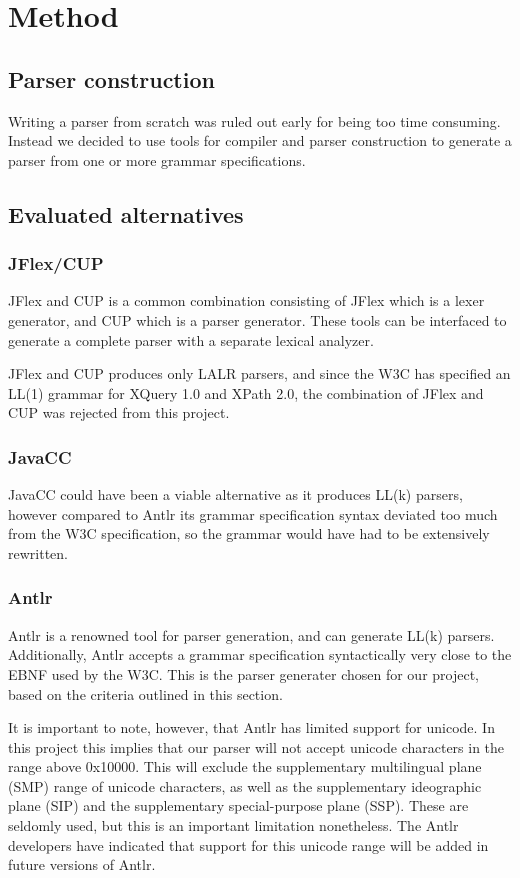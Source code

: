 \section{Method}
\subsection{Parser construction}
Writing a parser from scratch was ruled out early for being too time consuming.
Instead we decided to use tools for compiler and parser construction to generate
a parser from one or more grammar specifications.
\subsection{Evaluated alternatives}
\subsubsection{JFlex/CUP}
JFlex and CUP is a common combination consisting of JFlex which is a lexer
generator, and CUP which is a parser generator. These tools can be interfaced to
generate a complete parser with a separate lexical analyzer.

JFlex and CUP produces only LALR parsers, and since the W3C has specified an
LL(1) grammar for XQuery 1.0 and XPath 2.0, the combination of JFlex and CUP was
rejected from this project.
\subsubsection{JavaCC}
JavaCC could have been a viable alternative as it produces LL(k) parsers,
however compared to Antlr its grammar specification syntax deviated too much
from the W3C specification, so the grammar would have had to be extensively rewritten.
\subsubsection{Antlr}
Antlr is a renowned tool for parser generation, and can generate LL(k) parsers.
Additionally, Antlr accepts a grammar specification syntactically very close to
the EBNF used by the W3C. This is the parser generater chosen for our project,
based on the criteria outlined in this section.

It is important to note, however, that Antlr has limited support for unicode.
In this project this implies that our parser will not accept unicode characters
in the range above 0x10000. This will exclude the supplementary multilingual
plane (SMP) range of unicode characters, as well as the supplementary
ideographic plane (SIP) and the supplementary special-purpose plane (SSP). These
are seldomly used, but this is an important limitation nonetheless. The Antlr
developers have indicated that support for this unicode range will be added in
future versions of Antlr.
